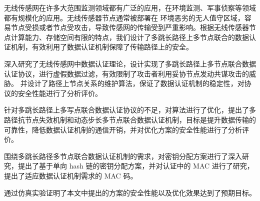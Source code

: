 \begin{cabstract}
无线传感网在许多大范围监测领域都有广泛的应用，在环境监测、军事侦察等领域都有规模化的应用。无线传感器节点通常被部署在
环境恶劣的无人值守区域，容易节点受损或者节点受攻击，导致传感网的传输受到严重影响。根据无线传感器节点计算能力、存储空间有限的特点，我们设计了多跳长路径上多节点联合的数据认证机制，有效利用了数据认证机制保障了传输路径上的安全。

深入研究了无线传感网中数据认证理论，设计实现了多跳长路径上多节点联合数据认证协议，进行虚假数据过滤，有效限制了攻击者利用妥协节点发动共谋攻击的威胁。
并设计了路径上节点关系的维护算法，保证了数据认证机制的稳定性，对协议的安全性能进行了分析评价。

针对多跳长路径上多写点联合数据认证协议的不足，对算法进行了优化，提出了多路径抗节点失效机制和动态步长多节点联合数据认证机制，目标是提升数据传输的可靠性，降低数据认证机制的通信开销，并对优化方案的安全性能进行了分析评价。

围绕多跳长路径多节点联合数据认证机制的需求，对密钥分配方案进行了深入研究，提出了基于单向 hash 链的密钥分配方案，并对认证中的 MAC 进行了研究，提出了适应数据认证机制需求的 MAC 码。

通过仿真实验证明了本文中提出的方案的安全性能以及优化效果达到了预期目标。

\end{cabstract}

